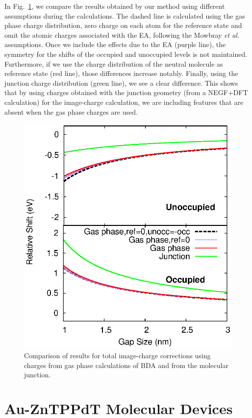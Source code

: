 \documentclass[aip,jcp,a4paper,reprint,floatfix,superscriptaddress]{revtex4-1}
\newcommand{\etal}{\emph{et al.}\xspace}
\begin{document}
In Fig.~\ref{fg:gas_vs_junction_BDA}, we compare the results obtained by our method using different assumptions during the calculations. The dashed line is calculated using the gas phase charge distribution, zero charge on each atom for the reference state and omit the atomic charges associated with the EA, following the Mowbray \etal assumptions. %
Once we include the effects due to the EA (purple line), the symmetry for the shifts of the occupied and unoccupied levels is not maintained. Furthermore, if we use the charge distribution of the neutral molecule as reference state (red line), those differences increase notably. Finally, using the junction charge distribution (green line), we see a clear difference. This shows that by using charges obtained with the junction geometry (from a NEGF+DFT calculation) for the image-charge calculation, we are including features that are absent when the gas phase charges are used.

\begin{figure}
\includegraphics[width=.8\columnwidth]{img/Methods/Us_vs_Mowbraygas_BDA-ref}
\caption{Comparison of results for total image-charge corrections using charges from gas phase calculations of BDA and from the molecular junction.} \label{fg:gas_vs_junction_BDA}
\end{figure}




\section{Au-ZnTPPdT Molecular Devices} \label{Sec:ZnTPP}
\end{document}
